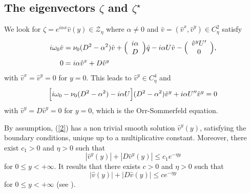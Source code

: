 \documentclass[11pt]{article}
\begin{document}




\subsection{The eigenvectors $\zeta$ and $\zeta^\star$}


We look for 
$\zeta = e^{i \alpha x} \hat v(y) \in \mathcal{Z}_\eta$
where $\alpha \ne 0$ and 
$\hat v = (\hat v^x, \hat v^y) \in C^2_\eta$
satisfy
\begin{align*}
i \omega_0 \hat v &= \nu_0 (D^2 - \alpha^2) \hat v
+ \Bigl( \begin{array}{c} i \alpha \cr D \cr \end{array} \Bigr) \hat q
- i \alpha U \hat v
- \Bigl( \begin{array}{c} \hat v^y U' \cr 0 \cr \end{array} \Bigr),
\\
0 &= i \alpha \hat v^x + D \hat v^y 
\end{align*}
with $\hat v^x = \hat v^y = 0$ for $y = 0$.
This leads to $\hat v^y \in C^4_\eta$ and
\begin{equation} \label{2}
\Bigl[ i \omega_0 - \nu_0 (D^2 - \alpha^2) - i \alpha U \Bigr]
(D^2 - \alpha^2) \hat v^y + i \alpha U'' \hat v^y = 0
\end{equation}
with $\hat v^y = D \hat v^y = 0$ for $y = 0$, which is the Orr-Sommerfeld equation.

By assumption, (\ref{2}) has a non trivial smooth solution $\hat v^y(y)$, satisfying the boundary conditions, 
unique up to a multiplicative constant. Moreover, there exist $c_1 > 0$ and $\eta > 0$ such that
$$
| \hat v^y(y) | + | D \hat v^y(y)| \le c_1 e^{- \eta y}
$$
for $0 \le y < + \infty$. 
It results that there exists $c > 0$ and $\eta > 0$ such that
$$
| \hat v(y) | + | D \hat v(y) | \le c e^{- \eta y}
$$
for $0 \le y < + \infty$ (see \cite{Guo}).
\end{document}
